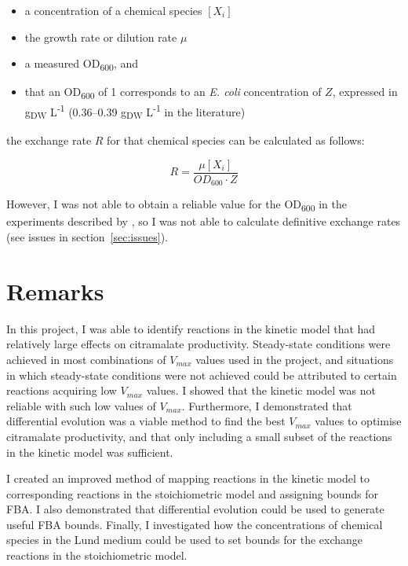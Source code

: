 \documentclass[parskip=full, numbers=noenddot]{scrreprt}
\begin{document}
\begin{itemize}
\item a concentration of a chemical species $[X_{i}]$
\item the growth rate or dilution rate $\mu$
\item a measured OD\textsubscript{600}, and
\item that an OD\textsubscript{600} of 1 corresponds to an \emph{E. coli} concentration of $Z$, expressed in g\textsubscript{DW} L\textsuperscript{-1} (0.36--0.39 g\textsubscript{DW} L\textsuperscript{-1} in the literature)
\end{itemize}
  
the exchange rate $R$ for that chemical species can be calculated as follows:

\[
  R = \frac{\mu[X_{i}]}{OD_{600} \cdot Z}
\]

However, I was not able to obtain a reliable value for the OD\textsubscript{600} in the experiments described by \citet{orth_comprehensive_2011}, so I was not able to calculate definitive exchange rates (see issues in section~\ref{sec:issues}).

\chapter{Remarks}
\label{ch:remarks}

In this project, I was able to identify reactions in the kinetic model that had relatively large effects on citramalate productivity. Steady-state conditions were achieved in most combinations of $V_{max}$ values used in the project, and situations in which steady-state conditions were not achieved could be attributed to certain reactions acquiring low $V_{max}$ values. I showed that the kinetic model was not reliable with such low values of $V_{max}$. Furthermore, I demonstrated that differential evolution was a viable method to find the best $V_{max}$ values to optimise citramalate productivity, and that only including a small subset of the reactions in the kinetic model was sufficient.

I created an improved method of mapping reactions in the kinetic model to corresponding reactions in the stoichiometric model and assigning bounds for FBA. I also demonstrated that differential evolution could be used to generate useful FBA bounds. Finally, I investigated how the concentrations of chemical species in the Lund medium could be used to set bounds for the exchange reactions in the stoichiometric model.
\end{document}

